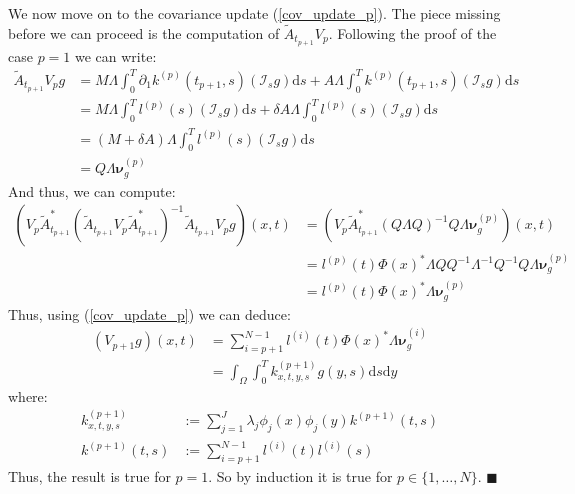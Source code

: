 \documentclass{article}
\renewcommand\qedsymbol{$\blacksquare$}
\theoremstyle{definition}
\theoremstyle{remark}
\theoremstyle{remark}
\begin{document}
\noindent We now move on to the covariance update (\ref{cov_update_p}). The piece missing before we can proceed is the computation of $\tilde{A}_{t_{p+1}}V_{p}$. Following the proof of the case $p=1$ we can write:
\begin{align}
    \tilde{A}_{t_{p+1}}V_{p}g &= M\Lambda\int_{0}^{T}\partial_{1}k^{(p)}(t_{p+1},s)(\mathcal{I}_{s}g)\mathrm{d}s + A\Lambda\int_{0}^{T}k^{(p)}(t_{p+1},s)(\mathcal{I}_{s}g)\mathrm{d}s \\
    &= M\Lambda\int_{0}^{T}l^{(p)}(s)(\mathcal{I}_{s}g)\mathrm{d}s + \delta A\Lambda\int_{0}^{T}l^{(p)}(s)(\mathcal{I}_{s}g)\mathrm{d}s \\
    &= (M+\delta A)\Lambda\int_{0}^{T}l^{(p)}(s)(\mathcal{I}_{s}g)\mathrm{d}s \\
    &= Q\Lambda\boldsymbol{\nu}_{g}^{(p)}
\end{align}
And thus, we can compute:
\begin{align*}
    (V_{p}\tilde{A}_{t_{p+1}}^{*}(\tilde{A}_{t_{p+1}}V_{p}\tilde{A}_{t_{p+1}}^{*})^{-1}\tilde{A}_{t_{p+1}}V_{p}g)(x,t) &=
    (V_{p}\tilde{A}_{t_{p+1}}^{*}(Q\Lambda Q)^{-1}Q\Lambda\boldsymbol{\nu}_{g}^{(p)})(x,t) \\
    &=l^{(p)}(t)\Phi(x)^{*}\Lambda Q Q^{-1}\Lambda^{-1}Q^{-1}Q\Lambda\boldsymbol{\nu}_{g}^{(p)} \\
    &=l^{(p)}(t)\Phi(x)^{*}\Lambda\boldsymbol{\nu}_{g}^{(p)}
\end{align*}
Thus, using (\ref{cov_update_p}) we can deduce:
\begin{align*}
    (V_{p+1}g)(x,t) &= \sum_{i=p+1}^{N-1}l^{(i)}(t)\Phi(x)^{*}\Lambda\boldsymbol{\nu}_{g}^{(i)} \\
    &= \int_{\Omega}\int_{0}^{T}k^{(p+1)}_{x,t,y,s}g(y,s)\mathrm{d}s\mathrm{d}y
\end{align*}
where:
\begin{align*}
    k^{(p+1)}_{x,t,y,s} &:= \sum_{j=1}^{J}\lambda_{j}\phi_{j}(x)\phi_{j}(y)k^{(p+1)}(t,s) \\
    k^{(p+1)}(t,s) &:= \sum_{i=p+1}^{N-1}l^{(i)}(t)l^{(i)}(s)
\end{align*}
Thus, the result is true for $p=1$. So by induction it is true for $p\in\{1,\dots,N\}$. \qedsymbol
\end{document}
